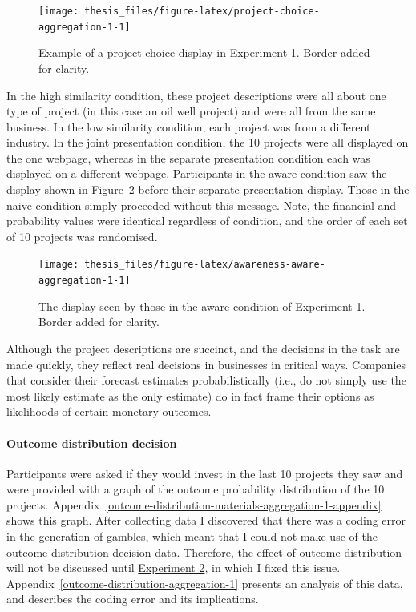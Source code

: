 \documentclass[a4paper, nobind, dvipsnames]{templates/ociamthesis}
\theoremstyle{definition}
\theoremstyle{definition}
\theoremstyle{definition}
\theoremstyle{definition}
\theoremstyle{remark}
\begin{document}
\begin{figure}
\texttt{[image: thesis\_files/figure-latex/project-choice-aggregation-1-1]} \caption{Example of a project choice display in Experiment 1. Border added for clarity.}\label{fig:project-choice-aggregation-1}
\end{figure}

In the high similarity condition, these project descriptions were all about one
type of project (in this case an oil well project) and were all from the same
business. In the low similarity condition, each project was from a different
industry. In the joint presentation condition, the 10 projects were all
displayed on the one webpage, whereas in the separate presentation condition
each was displayed on a different webpage. Participants in the aware condition
saw the display shown in Figure~\ref{fig:awareness-aware-aggregation-1} before
their separate presentation display. Those in the naive condition simply
proceeded without this message. Note, the financial and probability values were
identical regardless of condition, and the order of each set of 10 projects was
randomised.



\begin{figure}
\texttt{[image: thesis\_files/figure-latex/awareness-aware-aggregation-1-1]} \caption{The display seen by those in the aware condition of Experiment 1. Border added for clarity.}\label{fig:awareness-aware-aggregation-1}
\end{figure}

Although the project descriptions are succinct, and the decisions in the task
are made quickly, they reflect real decisions in businesses in critical ways.
Companies that consider their forecast estimates probabilistically (i.e., do not
simply use the most likely estimate as the only estimate) do in fact frame their
options as likelihoods of certain monetary outcomes.

\hypertarget{outcome-distribution-materials-aggregation-1}{%
\paragraph{Outcome distribution decision}\label{outcome-distribution-materials-aggregation-1}}

Participants were asked if they would invest in the last 10 projects they saw
and were provided with a graph of the outcome probability distribution of the 10
projects. Appendix~\ref{outcome-distribution-materials-aggregation-1-appendix}
shows this graph. After collecting data I discovered that there was a coding
error in the generation of gambles, which meant that I could not make use of the
outcome distribution decision data. Therefore, the effect of outcome
distribution will not be discussed until \protect\hyperlink{aggregation-2}{Experiment 2}, in
which I fixed this issue. Appendix~\ref{outcome-distribution-aggregation-1}
presents an analysis of this data, and describes the coding error and its
implications.
\end{document}
